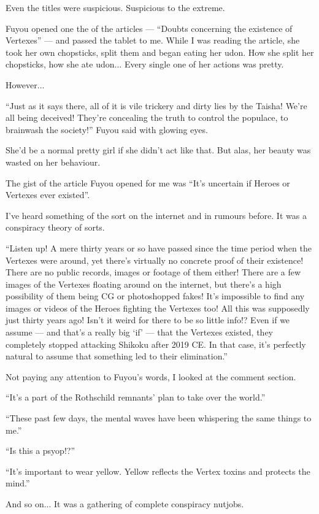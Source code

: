 Even the titles were suspicious. Suspicious to the extreme.

Fuyou opened one the of the articles --- ``Doubts concerning the existence of Vertexes'' --- and passed the tablet to me. While I was reading the article, she took her own chopsticks, split them and began eating her udon. How she split her chopsticks, how she ate udon... Every single one of her actions was pretty.

However...

``Just as it says there, all of it is vile trickery and dirty lies by the Taisha! We're all being deceived! They're concealing the truth to control the populace, to brainwash the society!'' Fuyou said with glowing eyes.

She'd be a normal pretty girl if she didn't act like that. But alas, her beauty was wasted on her behaviour.

The gist of the article Fuyou opened for me was ``It's uncertain if Heroes or Vertexes ever existed''.

I've heard something of the sort on the internet and in rumours before. It was a conspiracy theory of sorts.

``Listen up! A mere thirty years or so have passed since the time period when the Vertexes were around, yet there's virtually no concrete proof of their existence! There are no public records, images or footage of them either! There are a few images of the Vertexes floating around on the internet, but there's a high possibility of them being CG or photoshopped fakes! It's impossible to find any images or videos of the Heroes fighting the Vertexes too! All this was supposedly just thirty years ago! Isn't it weird for there to be so little info!? Even if we assume --- and that's a really big `if' --- that the Vertexes existed, they completely stopped attacking Shikoku after 2019 CE. In that case, it's perfectly natural to assume that something led to their elimination.''

Not paying any attention to Fuyou's words, I looked at the comment section.

``It's a part of the Rothschild remnants' plan to take over the world.''

``These past few days, the mental waves have been whispering the same things to me.''

``Is this a psyop!?''

``It's important to wear yellow. Yellow reflects the Vertex toxins and protects the mind.''

And so on... It was a gathering of complete conspiracy nutjobs.

